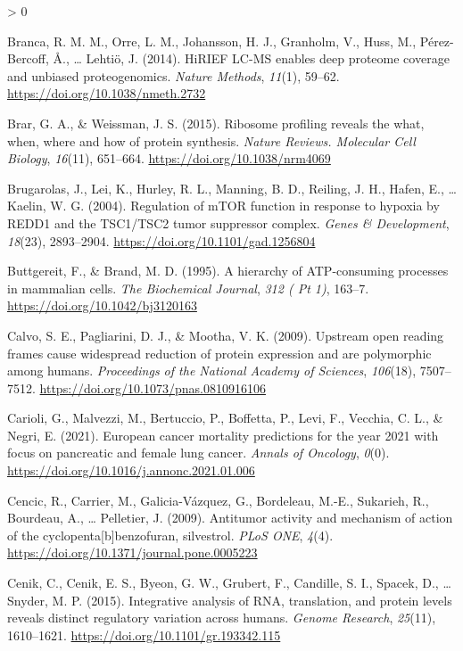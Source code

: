 \documentclass[
  12pt,
  openany]{book}
\newlength{\cslhangindent}
\newenvironment{CSLReferences}[2] %
 {%
  \setlength{\parindent}{0pt}
  \ifodd #1 \everypar{\setlength{\hangindent}{\cslhangindent}}\ignorespaces\fi
  \ifnum #2 > 0
  \setlength{\parskip}{#2\baselineskip}
  \fi
 }%
 {}
\begin{document}
\begin{CSLReferences}{1}{0}
\leavevmode\hypertarget{ref-Branca2014}{}%
Branca, R. M. M., Orre, L. M., Johansson, H. J., Granholm, V., Huss, M., Pérez-Bercoff, Å., \ldots{} Lehtiö, J. (2014). {HiRIEF} {LC}-{MS} enables deep proteome coverage and unbiased proteogenomics. \emph{Nature Methods}, \emph{11}(1), 59--62. \url{https://doi.org/10.1038/nmeth.2732}

\leavevmode\hypertarget{ref-Brar2015}{}%
Brar, G. A., \& Weissman, J. S. (2015). Ribosome profiling reveals the what, when, where and how of protein synthesis. \emph{Nature Reviews. Molecular Cell Biology}, \emph{16}(11), 651--664. \url{https://doi.org/10.1038/nrm4069}

\leavevmode\hypertarget{ref-Brugarolas2004}{}%
Brugarolas, J., Lei, K., Hurley, R. L., Manning, B. D., Reiling, J. H., Hafen, E., \ldots{} Kaelin, W. G. (2004). Regulation of {mTOR} function in response to hypoxia by {REDD}1 and the {TSC}1/{TSC}2 tumor suppressor complex. \emph{Genes \& Development}, \emph{18}(23), 2893--2904. \url{https://doi.org/10.1101/gad.1256804}

\leavevmode\hypertarget{ref-Buttgereit1995}{}%
Buttgereit, F., \& Brand, M. D. (1995). A hierarchy of {ATP}-consuming processes in mammalian cells. \emph{The Biochemical Journal}, \emph{312 ( Pt 1)}, 163--7. \url{https://doi.org/10.1042/bj3120163}

\leavevmode\hypertarget{ref-Calvo2009}{}%
Calvo, S. E., Pagliarini, D. J., \& Mootha, V. K. (2009). Upstream open reading frames cause widespread reduction of protein expression and are polymorphic among humans. \emph{Proceedings of the National Academy of Sciences}, \emph{106}(18), 7507--7512. \url{https://doi.org/10.1073/pnas.0810916106}

\leavevmode\hypertarget{ref-Carioli2021}{}%
Carioli, G., Malvezzi, M., Bertuccio, P., Boffetta, P., Levi, F., Vecchia, C. L., \& Negri, E. (2021). European cancer mortality predictions for the year 2021 with focus on pancreatic and female lung cancer. \emph{Annals of Oncology}, \emph{0}(0). \url{https://doi.org/10.1016/j.annonc.2021.01.006}

\leavevmode\hypertarget{ref-Cencic2009}{}%
Cencic, R., Carrier, M., Galicia-Vázquez, G., Bordeleau, M.-E., Sukarieh, R., Bourdeau, A., \ldots{} Pelletier, J. (2009). Antitumor activity and mechanism of action of the cyclopenta{[}b{]}benzofuran, silvestrol. \emph{{PLoS} {ONE}}, \emph{4}(4). \url{https://doi.org/10.1371/journal.pone.0005223}

\leavevmode\hypertarget{ref-Cenik2015}{}%
Cenik, C., Cenik, E. S., Byeon, G. W., Grubert, F., Candille, S. I., Spacek, D., \ldots{} Snyder, M. P. (2015). Integrative analysis of {RNA}, translation, and protein levels reveals distinct regulatory variation across humans. \emph{Genome Research}, \emph{25}(11), 1610--1621. \url{https://doi.org/10.1101/gr.193342.115}


\end{CSLReferences}
\end{document}
